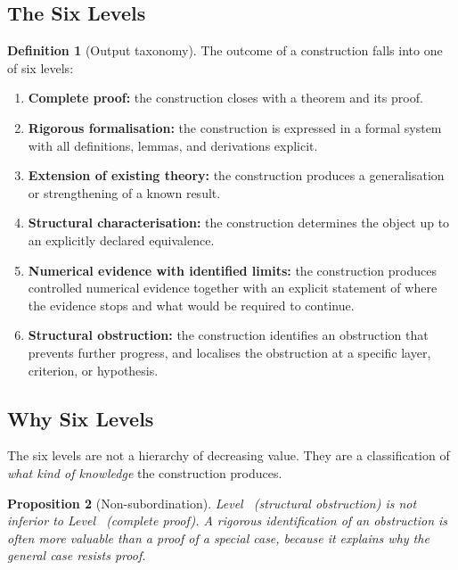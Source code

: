 \documentclass[11pt,a4paper]{article}
\theoremstyle{definition}
\newtheorem{definition}{Definition}[section]
\theoremstyle{plain}
\newtheorem{proposition}[definition]{Proposition}
\begin{document}
\subsection{The Six Levels}

\begin{definition}[Output taxonomy]\label{def:taxonomy}
The outcome of a construction falls into one of six levels:
\begin{enumerate}[label=\textbf{Level \Roman*.}]
  \item \textbf{Complete proof:} the construction closes with a
        theorem and its proof.
  \item \textbf{Rigorous formalisation:} the construction is
        expressed in a formal system with all definitions, lemmas,
        and derivations explicit.
  \item \textbf{Extension of existing theory:} the construction
        produces a generalisation or strengthening of a known
        result.
  \item \textbf{Structural characterisation:} the construction
        determines the object up to an explicitly declared
        equivalence.
  \item \textbf{Numerical evidence with identified limits:} the
        construction produces controlled numerical evidence
        together with an explicit statement of where the evidence
        stops and what would be required to continue.
  \item \textbf{Structural obstruction:} the construction
        identifies an obstruction that prevents further progress,
        and localises the obstruction at a specific layer,
        criterion, or hypothesis.
\end{enumerate}
\end{definition}

\subsection{Why Six Levels}

The six levels are not a hierarchy of decreasing value. They are a
classification of \emph{what kind of knowledge} the construction
produces.

\begin{proposition}[Non-subordination]\label{pr:non-sub}
Level~\RomanVI{} (structural obstruction) is not inferior to
Level~\RomanI{} (complete proof). A rigorous identification of an
obstruction is often more valuable than a proof of a special case,
because it explains \emph{why} the general case resists proof.
\end{proposition}
\end{document}

